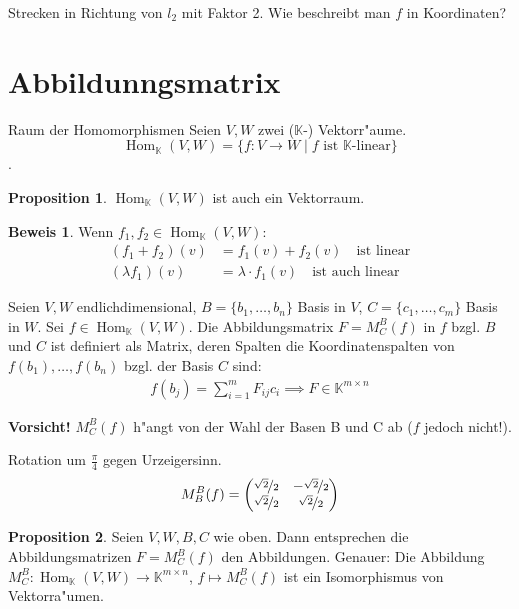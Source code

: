 \documentclass[fontsize=11pt,paper=a4,BCOR=0mm,DIV=11,automark,headsepline]{scrbook}
\DeclareMathOperator{\mHom}{Hom}
\theoremstyle{remark}
\theoremstyle{definition}
\newtheorem*{proposition}{Proposition}
\theoremstyle{proof}
\newtheorem*{prof}{Beweis}
\theoremstyle{remark}
\begin{document}
\begin{exa}
Strecken in Richtung von \(l_2\) mit Faktor 2. Wie beschreibt man \(f\) in
Koordinaten?
\end{exa}

\section{Abbildunngsmatrix}
\begin{definition}{Raum der Homomorphismen}{}
Seien \(V,W\) zwei (\(\mathbb{K}\)-) Vektorr"aume.
\[\mHom_\mathbb{K}(V,W) = \{f: V\to W \mid f \text{ ist }\mathbb{K}\text{-linear}\}\].
\end{definition}
\begin{proposition}
\(\mHom_\mathbb{K}(V,W)\) ist auch ein Vektorraum.
\end{proposition}
\begin{prof}
Wenn \(f_1, f_2 \in \mHom_\mathbb{K}(V,W)\):
\begin{align*}
(f_1 + f_2)(v) &= f_1(v) + f_2(v) \quad\text{ist linear} \\
(\lambda f_1)(v) &= \lambda\cdot f_1(v)\quad\text{ist auch linear}
\end{align*}
\end{prof}

Seien \(V, W\) endlichdimensional, \(B = \{b_1, \dots, b_n\}\) Basis in \(V\), \(C = \{c_1, \dots, c_m\}\) Basis in \(W\). Sei \(f \in \mHom_\mathbb{K}(V,W)\). Die Abbildungsmatrix \(F= M_C^B(f)\) in \(f\) bzgl. \(B\) und \(C\) ist definiert als
Matrix, deren Spalten die Koordinatenspalten von \(f(b_1),\dots, f(b_n)\) bzgl. der Basis \(C\) sind:
\begin{align*}
f(b_j) = \sum_{i=1}^mF_{ij}c_i \implies F \in \mathbb{K}^{m\times n}
\end{align*}

\textbf{Vorsicht!} \(M_C^B(f)\) h"angt von der Wahl der Basen B und C ab (\(f\) jedoch nicht!).

\begin{exa}
Rotation um \(\frac{\pi}{4}\) gegen Urzeigersinn.
\begin{align*}
M_B^B(f) = \begin{pmatrix}
\nicefrac{\sqrt{2}}{2} & -\nicefrac{\sqrt{2}}{2}\\
\nicefrac{\sqrt{2}}{2} & \nicefrac{\sqrt{2}}{2}
\end{pmatrix}
\end{align*}
\end{exa}

\begin{proposition} Seien \(V,W,B,C\) wie oben. Dann entsprechen die Abbildungsmatrizen
 \(F = M_C^B(f)\) den Abbildungen.  Genauer: Die Abbildung \(M_C^B: \mHom_\mathbb{K}(V,W)\to\mathbb{K}^{m\times n}\), \(f \mapsto M_C^B(f)\) ist ein Isomorphismus von
 Vektorra"umen.
\end{proposition}
\end{document}
